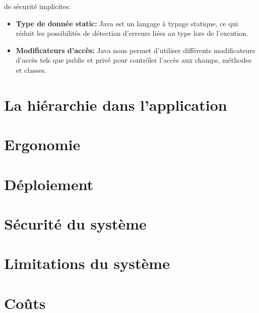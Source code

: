 \begin{itemize}
                de sécurité implicites:
                        \begin{itemize}
                                \item \textbf{Type de donnée static: } Java est un langage à typage statique, ce qui réduit les 
                                possibilités de détection d'erreurs liées au type lors de l'excution.
                                \item \textbf{ Modificateurs d'accès: } Java nous permet d'utiliser 
                                différents modificateurs d'accès tels que public et privé pour contrôler l'accès aux champs, 
                                méthodes et classes.
                        \end{itemize}
        \end{itemize}
        \section{La hiérarchie dans l'application}
        \lipsum[1]
        \section{Ergonomie}
        \lipsum[1]
        \section{Déploiement}
        \lipsum[1]
        \section{Sécurité du système}
        \lipsum[1]
        \section{Limitations du système}
        \lipsum[1]
        \section{Coûts}
        \lipsum[1]
    
